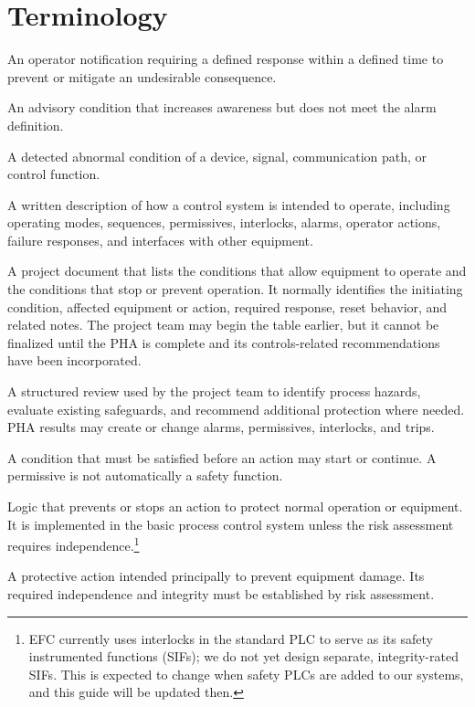 \chapter{Terminology}\label{ch:terminology}
\begin{description}[style=nextline,leftmargin=0pt]
  \item[Alarm] An operator notification requiring a defined response within a defined time to prevent or mitigate an undesirable consequence.
  \item[Warning] An advisory condition that increases awareness but does not meet the alarm definition.
  \item[Fault] A detected abnormal condition of a device, signal, communication path, or control function.
  \item[Control narrative] A written description of how a control system is intended to operate, including operating modes, sequences, permissives, interlocks, alarms, operator actions, failure responses, and interfaces with other equipment.
  \item[Table of Interlocks and Permissives] A project document that lists the conditions that allow equipment to operate and the conditions that stop or prevent operation. It normally identifies the initiating condition, affected equipment or action, required response, reset behavior, and related notes. The project team may begin the table earlier, but it cannot be finalized until the PHA is complete and its controls-related recommendations have been incorporated.
  \item[Process Hazard Analysis (PHA)] A structured review used by the project team to identify process hazards, evaluate existing safeguards, and recommend additional protection where needed. PHA results may create or change alarms, permissives, interlocks, and trips.
  \item[Permissive] A condition that must be satisfied before an action may start or continue. A permissive is not automatically a safety function.
  \item[Control interlock] Logic that prevents or stops an action to protect normal operation or equipment. It is implemented in the basic process control system unless the risk assessment requires independence.\footnote{EFC currently uses interlocks in the standard PLC to serve as its safety instrumented functions (SIFs); we do not yet design separate, integrity-rated SIFs. This is expected to change when safety PLCs are added to our systems, and this guide will be updated then.}
  \item[Equipment protective interlock] A protective action intended principally to prevent equipment damage. Its required independence and integrity must be established by risk assessment.

\end{description}
